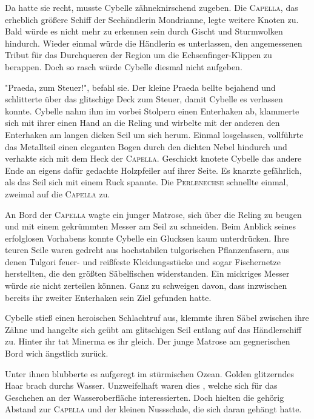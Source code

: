 Da hatte sie recht, musste Cybelle zähneknirschend zugeben. Die \textsc{Capella}, das erheblich größere Schiff der Seehändlerin Mondrianne, legte weitere Knoten zu. Bald würde es nicht mehr zu erkennen sein durch Gischt und Sturmwolken hindurch. Wieder einmal würde die Händlerin es unterlassen, den angemessenen Tribut für das Durchqueren der Region um die Echsenfinger-Klippen zu berappen. Doch so rasch würde Cybelle diesmal nicht aufgeben. 

"Praeda, zum Steuer!", befahl sie. Der kleine Praeda bellte bejahend und schlitterte über das glitschige Deck zum Steuer, damit Cybelle es verlassen konnte. Cybelle nahm ihm im vorbei Stolpern einen Enterhaken ab, klammerte sich mit ihrer einen Hand an die Reling und wirbelte mit der anderen den Enterhaken am langen dicken Seil um sich herum. Einmal losgelassen, vollführte das Metallteil einen eleganten Bogen durch den dichten Nebel hindurch und verhakte sich mit dem Heck der \textsc{Capella}. Geschickt knotete Cybelle das andere Ende an eigens dafür gedachte Holzpfeiler auf ihrer Seite. Es knarzte gefährlich, als das Seil sich mit einem Ruck spannte. Die \textsc{Perlenechse} schnellte einmal, zweimal auf die \textsc{Capella} zu. 

An Bord der \textsc{Capella} wagte ein junger Matrose, sich über die Reling zu beugen und mit einem gekrümmten Messer am Seil zu schneiden. Beim Anblick seines erfolglosen Vorhabens konnte Cybelle ein Glucksen kaum unterdrücken. Ihre teuren Seile waren gedreht aus hochstabilen tulgorischen Pflanzenfasern, aus denen Tulgori feuer- und reißfeste Kleidungsstücke und sogar Fischernetze herstellten, die den größten Säbelfischen widerstanden. Ein mickriges Messer würde sie nicht zerteilen können. Ganz zu schweigen davon, dass inzwischen bereits ihr zweiter Enterhaken sein Ziel gefunden hatte. 

Cybelle stieß einen heroischen Schlachtruf aus, klemmte ihren Säbel zwischen ihre Zähne und hangelte sich geübt am glitschigen Seil entlang auf das Händlerschiff zu. Hinter ihr tat Minerma es ihr gleich. Der junge Matrose am gegnerischen Bord wich ängstlich zurück.

Unter ihnen blubberte es aufgeregt im stürmischen Ozean. Golden glitzerndes Haar brach durchs Wasser. Unzweifelhaft waren dies , welche sich für das Geschehen an der Wasseroberfläche interessierten. Doch hielten die  gehörig Abstand zur \textsc{Capella} und der kleinen Nussschale, die sich daran gehängt hatte.

